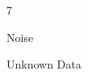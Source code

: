 \documentclass{article}
\begin{document}
\begin{ukon-infie}[12.12.17]{7}
\begin{exercise}[p=3]{Noise}
			
		\end{exercise}
		
		\begin{exercise}[p=7]{Unknown Data}
		\end{exercise}
		
		
\end{ukon-infie}
\end{document}
